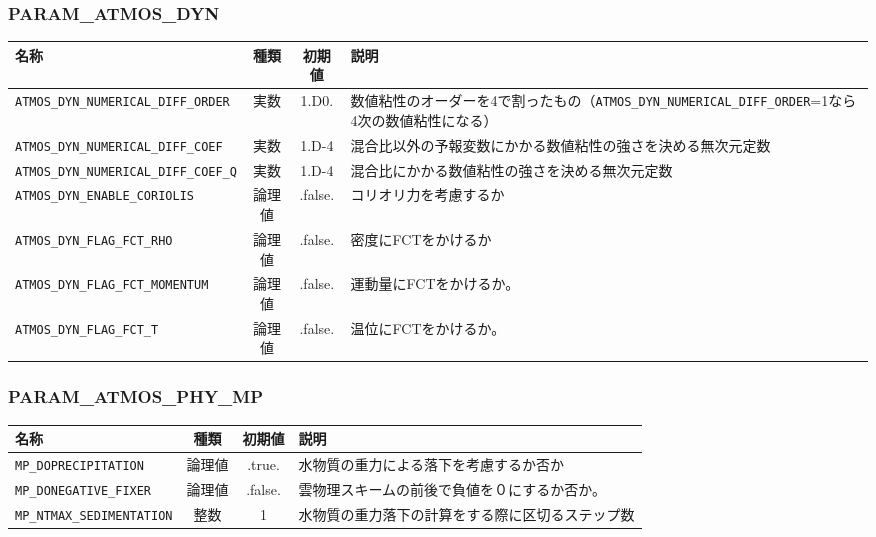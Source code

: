 \subsubsection{PARAM\_ATMOS\_DYN}
\begin{tabularx}{150mm}{|l|c|c|X|} \hline
 \rowcolor[gray]{0.9} 名称 & 種類 & 初期値 & 説明 \\ \hline
 \verb|ATMOS_DYN_NUMERICAL_DIFF_ORDER| & 実数 & 1.D0. & 数値粘性のオーダーを4で割ったもの（\verb|ATMOS_DYN_NUMERICAL_DIFF_ORDER|=1なら4次の数値粘性になる） \\ \hline
 \verb|ATMOS_DYN_NUMERICAL_DIFF_COEF| & 実数 & 1.D-4 & 混合比以外の予報変数にかかる数値粘性の強さを決める無次元定数\\ \hline
 \verb|ATMOS_DYN_NUMERICAL_DIFF_COEF_Q| & 実数 & 1.D-4 & 混合比にかかる数値粘性の強さを決める無次元定数\\ \hline
 \verb|ATMOS_DYN_ENABLE_CORIOLIS| & 論理値 & .false. & コリオリ力を考慮するか \\ \hline
 \verb|ATMOS_DYN_FLAG_FCT_RHO| & 論理値 & .false. & 密度にFCTをかけるか \\ \hline
 \verb|ATMOS_DYN_FLAG_FCT_MOMENTUM| & 論理値 & .false. & 運動量にFCTをかけるか。 \\ \hline
 \verb|ATMOS_DYN_FLAG_FCT_T| & 論理値 & .false. & 温位にFCTをかけるか。\\ \hline
\end{tabularx}

\subsubsection{PARAM\_ATMOS\_PHY\_MP}
\begin{tabularx}{150mm}{|l|c|c|X|} \hline
 \rowcolor[gray]{0.9} 名称 & 種類 & 初期値 & 説明 \\ \hline
 \verb|MP_DOPRECIPITATION| & 論理値 & .true. & 水物質の重力による落下を考慮するか否か \\ \hline
 \verb|MP_DONEGATIVE_FIXER| & 論理値 & .false. & 雲物理スキームの前後で負値を０にするか否か。 \\ \hline
 \verb|MP_NTMAX_SEDIMENTATION| & 整数 & 1 & 水物質の重力落下の計算をする際に区切るステップ数 \\ \hline
\end{tabularx}


